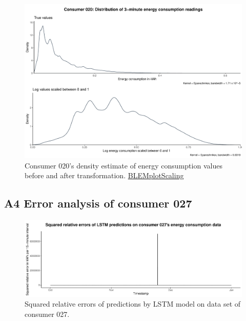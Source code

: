 \begin{centering}
\begin{figure}[!htbp]
        \includegraphics[width=\textwidth-0.85cm]{thesis/graphs/c020_density.pdf}
        \caption[Energy consumption distribution before and after transformation]{Consumer 020's density estimate of energy consumption values before and after transformation. \quantnet\href{ }{BLEMplotScaling}}
\end{figure}
\end{centering}


\subsection*{\hypertarget{AppA4:Figures:erroranalysis}{A4} Error analysis of consumer 027}\label{AppA4:Figures:erroranalysis}

\begin{centering}
\begin{figure}[H]
    \includegraphics[width=\textwidth]{thesis/graphs/evaluation/c027_squarederrors.pdf}
    \caption[Squared relative errors of predictions by LSTM model on consumer 027]{Squared relative errors of predictions by LSTM model on data set of consumer 027. \quantnet\href{ }{}}
\end{figure}
\end{centering}



